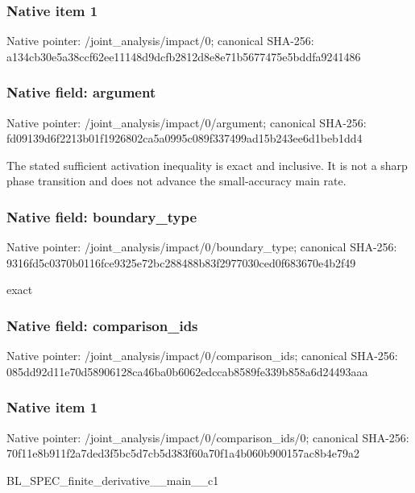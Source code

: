 \documentclass[10pt,a4paper]{article}
\begin{document}
\subsubsection{Native item 1}
Native pointer: /joint\_\allowbreak{}analysis/impact/0; canonical SHA-256: a134cb30e5a38ccf62ee11148d9dcfb2812d8e8e71b5677475e5bddfa9241486

\subsubsection{Native field: argument}
Native pointer: /joint\_\allowbreak{}analysis/impact/0/argument; canonical SHA-256: fd09139d6f2213b01f1926802ca5a0995c089f337499ad15b243ee6d1beb1dd4

\begingroup\raggedright\sloppy The stated sufficient activation inequality is exact and inclusive. It is not a sharp phase transition and does not advance the small-accuracy main rate.\par\endgroup

\subsubsection{Native field: boundary\_\allowbreak{}type}
Native pointer: /joint\_\allowbreak{}analysis/impact/0/boundary\_\allowbreak{}type; canonical SHA-256: 9316fd5c0370b0116fce9325e72bc288488b83f2977030ced0f683670e4b2f49

\begingroup\raggedright\sloppy exact\par\endgroup

\subsubsection{Native field: comparison\_\allowbreak{}ids}
Native pointer: /joint\_\allowbreak{}analysis/impact/0/comparison\_\allowbreak{}ids; canonical SHA-256: 085dd92d11e70d58906128ca46ba0b6062edccab8589fe339b858a6d24493aaa

\subsubsection{Native item 1}
Native pointer: /joint\_\allowbreak{}analysis/impact/0/comparison\_\allowbreak{}ids/0; canonical SHA-256: 70f11e8b911f2a7ded3f5bc5d7cb5d383f60a70f1a4b060b900157ac8b4e79a2

\begingroup\raggedright\sloppy BL\_\allowbreak{}SPEC\_\allowbreak{}finite\_\allowbreak{}derivative\_\allowbreak{}\_\allowbreak{}main\_\allowbreak{}\_\allowbreak{}c1\par\endgroup
\end{document}

